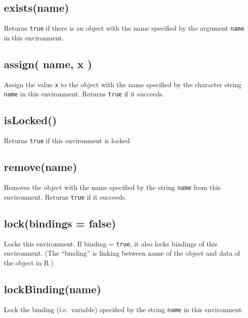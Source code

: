 \documentclass[]{book}
\begin{document}
\hypertarget{existsname}{%
\subsection{exists(name)}\label{existsname}}

Returns \texttt{true} if there is an object with the name specified by the argument \texttt{name} in this environment.

\hypertarget{assign-name-x}{%
\subsection{assign( name, x )}\label{assign-name-x}}

Assign the value \texttt{x} to the object with the name specified by the character string \texttt{name} in this environment. Returns \texttt{true} if it succeeds.

\hypertarget{islocked}{%
\subsection{isLocked()}\label{islocked}}

Returns \texttt{true} if this environment is locked.

\hypertarget{removename}{%
\subsection{remove(name)}\label{removename}}

Removes the object with the name specified by the string \texttt{name} from this environment. Returns \texttt{true} if it succeeds.

\hypertarget{lockbindings-false}{%
\subsection{lock(bindings = false)}\label{lockbindings-false}}

Locks this environment. If binding = \texttt{true}, it also locks bindings of this environment. (The ``binding'' is linking between name of the object and data of the object in R.)

\hypertarget{lockbindingname}{%
\subsection{lockBinding(name)}\label{lockbindingname}}

Lock the binding (i.e.~variable) specified by the string \texttt{name} in this environment.
\end{document}
